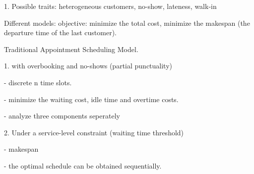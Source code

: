 \documentclass{article}
\newcommand{\Z}{\mathbf{Z}}
\newcommand{\D}{\bm{\Delta}}
\begin{document}
1. Possible traits: heterogeneous customers, no-show, lateness, walk-in

Different models: objective: minimize the total cost, minimize the makespan (the departure time of the last customer).


Traditional Appointment Scheduling Model.

1. with overbooking and no-shows (partial punctuality)

- discrete n time slots.

- minimize the waiting cost, idle time and overtime costs.

- analyze three components seperately


2. Under a service-level constraint (waiting time threshold)

- makespan

- the optimal schedule can be obtained sequentially.







\end{document}
